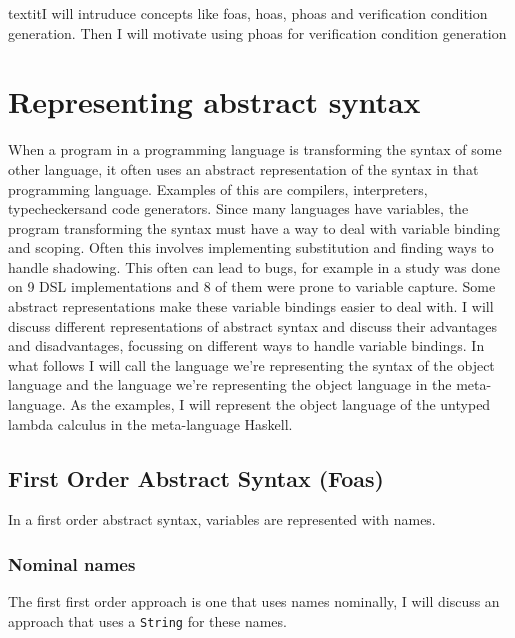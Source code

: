 \documentclass[]{article}
\title{}
\author{}
\begin{document}
\maketitle


\label{cha:1}
textit{I will intruduce concepts like foas, hoas, phoas and verification condition generation. Then I will motivate using phoas for verification condition generation}

\section{Representing abstract syntax}

When a program in a programming language is transforming the syntax of some other language, it often uses an abstract representation of the syntax in that programming language. Examples of this are compilers, interpreters, typecheckersand code generators. Since many languages have variables, the program transforming the syntax must have a way to deal with variable binding and scoping. Often this involves implementing substitution and finding ways to handle shadowing. This often can lead to bugs, for example in \cite{captureAvoiding} a study was done on 9 DSL implementations and 8 of them were prone to variable capture. Some abstract representations make these variable bindings easier to deal with. I will discuss different representations of abstract syntax and discuss their advantages and disadvantages, focussing on different ways to handle variable bindings. In what follows I will call the language we're representing the syntax of the object language and the language we're representing the object language in the meta-language. As the examples, I will represent the object language of the untyped lambda calculus in the meta-language Haskell.

\subsection{First Order Abstract Syntax (Foas)}
In a first order abstract syntax, variables are represented with names. 



\subsubsection{Nominal names}
The first first order approach is one that uses names nominally, I will discuss an approach that uses a \texttt{String} for these names.
\end{document}
